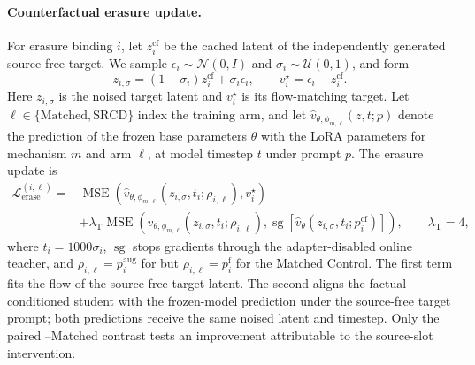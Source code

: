 \paragraph{Counterfactual erasure update.}
For erasure binding \(i\), let \(z_i^{\mathrm{cf}}\) be the cached latent of
the independently generated source-free target. We sample
\(\epsilon_i\sim\mathcal{N}(0,I)\) and
\(\sigma_i\sim\mathcal{U}(0,1)\), and form
\begin{equation}
  z_{i,\sigma}
  =
  (1-\sigma_i)z_i^{\mathrm{cf}}+\sigma_i\epsilon_i,
  \qquad
  v_i^\star=\epsilon_i-z_i^{\mathrm{cf}}.
  \label{eq:counterfactual-flow-path}
\end{equation}
Here \(z_{i,\sigma}\) is the noised target latent and \(v_i^\star\) is its
flow-matching target. Let
\(\ell\in\{\mathrm{Matched},\mathrm{SRCD}\}\) index the training arm, and let
\(\widehat v_{\theta,\phi_{m,\ell}}(z,t;p)\) denote the prediction of the
frozen base parameters \(\theta\) with the LoRA parameters for mechanism \(m\)
and arm \(\ell\), at model timestep \(t\) under prompt \(p\). The erasure
update is
\begin{align}
  \mathcal{L}_{\mathrm{erase}}^{(i,\ell)}
  ={}&
  \operatorname{MSE}\!\left(
    \widehat v_{\theta,\phi_{m,\ell}}(z_{i,\sigma},t_i;\rho_{i,\ell}),
    v_i^\star
  \right)
  \nonumber\\
  &+
  \lambda_{\mathrm T}
  \operatorname{MSE}\!\left(
    \widehat v_{\theta,\phi_{m,\ell}}(z_{i,\sigma},t_i;\rho_{i,\ell}),
    \operatorname{sg}\!\left[
      \widehat v_{\theta}(z_{i,\sigma},t_i;p_i^{\mathrm{cf}})
    \right]
  \right),
  \qquad \lambda_{\mathrm T}=4,
  \label{eq:counterfactual-erasure-loss}
\end{align}
where \(t_i=1000\sigma_i\), \(\operatorname{sg}\) stops gradients through
the adapter-disabled online teacher, and
\(\rho_{i,\ell}=p_i^{\mathrm{aug}}\) for \methodshort{} but
\(\rho_{i,\ell}=p_i^{\mathrm f}\) for the Matched Control. The
first term fits the flow of the source-free target latent. The second aligns
the factual-conditioned student with the frozen-model prediction under the
source-free target prompt; both predictions receive the same noised latent
and timestep. Only the paired \methodshort{}--Matched
contrast tests an improvement attributable to the source-slot intervention.

